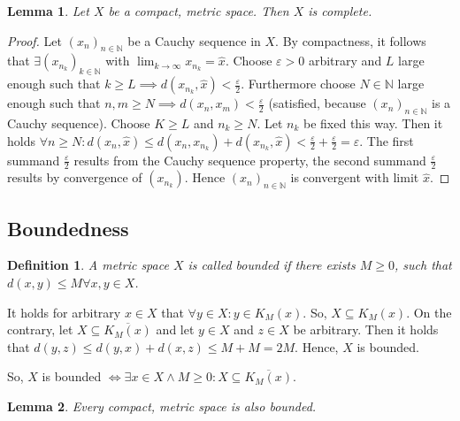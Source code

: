 \documentclass{article}
\newtheorem{definition}{Definition}  \numberwithin{definition}{section}
\newtheorem{lemma}{Lemma}  \numberwithin{lemma}{section}
\begin{document}
\begin{lemma} %
  Let $X$ be a compact, metric space. Then $X$ is complete.
\end{lemma}
\begin{proof}
  Let $(x_n)_{n\in\mathbb N}$ be a Cauchy sequence in $X$. By compactness, it follows that
  $\exists (x_{n_k})_{k \in \mathbb N}$ with $\lim_{k\to\infty} x_{n_k} = \hat{x}$.
  Choose $\varepsilon > 0$ arbitrary and $L$ large enough such that $k \geq L \implies d(x_{n_k}, \hat{x}) < \frac\varepsilon2$. Furthermore choose $N \in \mathbb N$ large enough such that $n,m \geq N \implies d(x_n, x_m) < \frac\varepsilon2$ (satisfied, because $(x_n)_{n \in \mathbb N}$ is a Cauchy sequence).
  Choose $K \geq L$ and $n_k \geq N$. Let $n_k$ be fixed this way.
  Then it holds $\forall n \geq N: d(x_n, \hat{x}) \leq d(x_n, x_{n_k}) + d(x_{n_k}, \hat{x}) < \frac\varepsilon2 + \frac\varepsilon2 = \varepsilon$. The first summand $\frac\varepsilon2$ results from the Cauchy sequence property, the second summand $\frac\varepsilon2$ results by convergence of $(x_{n_k})$. Hence $(x_n)_{n\in\mathbb N}$ is convergent with limit $\hat{x}$.
\end{proof}

\subsection{Boundedness}
\begin{definition} %
  A metric space $X$ is called \emph{bounded} if there exists $M \geq 0$, such that $d(x,y) \leq M \forall x,y \in X$.
\end{definition}
It holds for arbitrary $x \in X$ that $\forall y \in X: y \in K_M(x)$.
So, $X \subseteq K_M(x)$.
On the contrary, let $X \subseteq \overline{K_M(x)}$ and let $y \in X$ and $z \in X$ be arbitrary. Then it holds that $d(y, z) \leq d(y, x) + d(x, z) \leq M + M = 2M$. Hence, $X$ is bounded.

So, $X$ is bounded $\iff \exists x \in X \land M \geq 0: X \subseteq \overline{K_M(x)}$.

\begin{lemma} %
  Every compact, metric space is also bounded.
\end{lemma}
\end{document}
